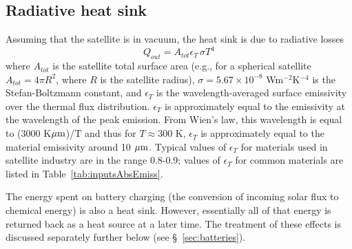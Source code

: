 \documentclass[]{aastex62}
\def\eq#1{\begin{equation} #1 \end{equation}}
\def\mic              {\hbox{$\mu\mathrm{m}$}}
\begin{document}
\newpage
\subsection{Radiative heat sink} 

Assuming that the satellite is in vacuum, the heat sink is due to radiative losses
\eq{
\label{eq:Qout}
                      Q_{out} = A_{tot} \epsilon_T \, \sigma T^4  
}
where $A_{tot}$ is the satellite total surface area (e.g., for a spherical satellite $A_{tot} = 4\pi R^2$,
where $R$ is the satellite radius), $\sigma=5.67\times10^{-8}$ Wm$^{-2}$K$^{-4}$ is the Stefan-Boltzmann 
constant,  and $\epsilon_T$ is the wavelength-averaged surface emissivity over the thermal flux distribution. 
$\epsilon_T$ is approximately equal to the emissivity at the wavelength of the peak emission. From Wien's 
law, this wavelength is equal to (3000 K$\mic$)/T and thus for $T \approx 300$ K, $\epsilon_T$ is approximately 
equal to the material emissivity around 10 $\mic$. Typical values of $\epsilon_T$  for materials used in 
satellite industry are in the range 0.8-0.9; values of $\epsilon_T$ for common materials are listed in 
Table~\ref{tab:inputsAbsEmiss}. 

The energy spent on battery charging (the conversion of incoming solar flux to chemical energy) is 
also a heat sink. However, essentially all of that energy is returned back as a heat source at a later time. 
The treatment of these effects is discussed separately further below (see \S~\ref{sec:batteries}). 
\end{document}
